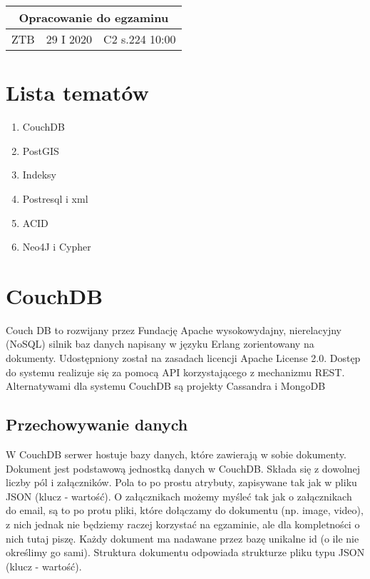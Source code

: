 \documentclass[a4paper,15pt]{article}
\begin{document}
\begin{table}
\begin{center}
\begin{tabular}{|c|c|c|}
\hline
\multicolumn{3}{|c|}{\textbf{Opracowanie do egzaminu}} \\ \hline ZTB & 29 I 2020 & C2 s.224 10:00 \\ \hline

\end{tabular}
\end{center}
\end{table}

\tableofcontents

\newpage
\section{Lista tematów}
\begin{enumerate}
\item CouchDB
\item PostGIS
\item Indeksy
\item Postresql i xml
\item ACID
\item Neo4J i Cypher
\end{enumerate}


\section{CouchDB}

Couch DB to rozwijany przez Fundację Apache wysokowydajny, nierelacyjny (NoSQL) silnik baz danych napisany w języku Erlang zorientowany na dokumenty. Udostępniony został na zasadach licencji Apache License 2.0. Dostęp do systemu realizuje się za pomocą API korzystającego z mechanizmu REST. \\

Alternatywami dla systemu CouchDB są projekty Cassandra i MongoDB


\subsection{Przechowywanie danych}

W CouchDB serwer hostuje bazy danych, które zawierają w sobie dokumenty. Dokument jest podstawową jednostką danych w CouchDB. Składa się z dowolnej liczby pól i załączników. Pola to po prostu atrybuty, zapisywane tak jak w pliku JSON (klucz - wartość). O załącznikach możemy myśleć tak jak o załącznikach do email, są to po protu pliki, które dołączamy do dokumentu (np. image, video), z nich jednak nie będziemy raczej korzystać na egzaminie, ale dla kompletności o nich tutaj piszę. Każdy dokument ma nadawane przez bazę unikalne id (o ile nie określimy go sami). Struktura dokumentu odpowiada strukturze pliku typu JSON (klucz - wartość). \\
\end{document}

